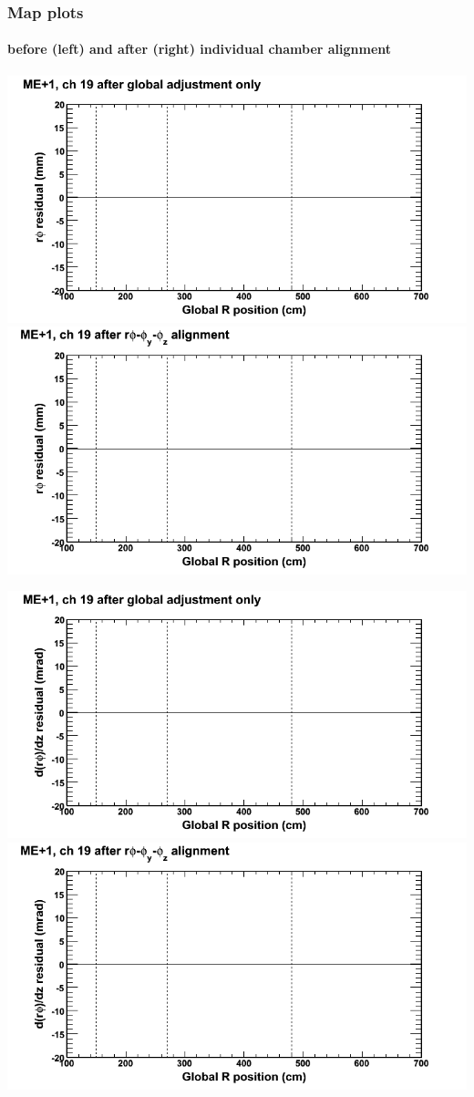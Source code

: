 \documentclass[compress]{beamer}
\begin{document}
\begin{frame}
\frametitle{Map plots}
\framesubtitle{before (left) and after (right) individual chamber alignment}
\includegraphics[width=0.5\linewidth]{ringmapplots_3dof/before_CSCvsr_mep1ch19_x.png} \includegraphics[width=0.5\linewidth]{ringmapplots_3dof/after_CSCvsr_mep1ch19_x.png}

\includegraphics[width=0.5\linewidth]{ringmapplots_3dof/before_CSCvsr_mep1ch19_dxdz.png} \includegraphics[width=0.5\linewidth]{ringmapplots_3dof/after_CSCvsr_mep1ch19_dxdz.png}
\end{frame}
\end{document}
